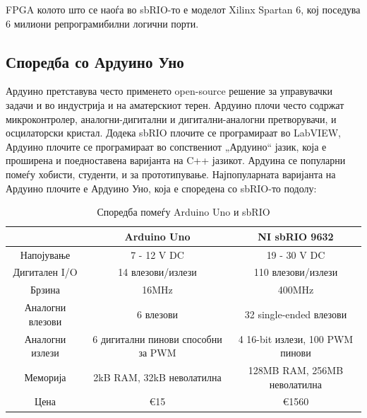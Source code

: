 \documentclass{article}
\begin{document}
FPGA колото што се наоѓа во sbRIO-то е моделот Xilinx Spartan 6, кој поседува 6 милиони репрограмибилни логични порти.
\subsection{Споредба со Ардуино Уно}
Ардуино претставува често применето open-source решение за управувачки задачи и во индустрија и на аматерскиот терен. Ардуино плочи често содржат микроконтролер, аналогни-дигитални и дигитални-аналогни претворувачи, и осцилаторски кристал. Додека sbRIO плочите се програмираат во LabVIEW, Ардуино плочите се програмираат во сопствениот „Ардуино“ јазик, која е проширена и поедноставена варијанта на C++ јазикот. Ардуина се популарни помеѓу хобисти, студенти, и за прототипување. Најпопуларната варијанта на Ардуино плочите е Ардуино Уно, која е споредена со sbRIO-то подолу:    
\begin{table}[h]
\caption{Споредба помеѓу Arduino Uno и sbRIO}
\label{tab:title}

\begin{center}
\begin{tabular}{||c|c|c||}
\hline
  & Arduino Uno & NI sbRIO 9632 \\ [0.75ex]
\hline \hline
Напојување & 7 - 12 V DC & 19 - 30 V DC \\
\hline 
Дигитален I/O & 14 влезови/излези & 110 влезови/излези \\
\hline
Брзина & 16MHz & 400MHz \\

\hline
Аналогни влезови & 6 влезови & 32 single-ended влезови \\
\hline
Аналогни излези & 6 дигитални пинови способни за PWM & 4 16-bit излези, 100 PWM пинови \\
\hline
Меморија & 2kB RAM, 32kB неволатилна & 128MB RAM, 256MB неволатилна \\ 
\hline
Цена & €15 & €1560 \\ [0.5ex]
\hline
\end{tabular}
\end{center}
\end{table}
\newpage
\end{document}
